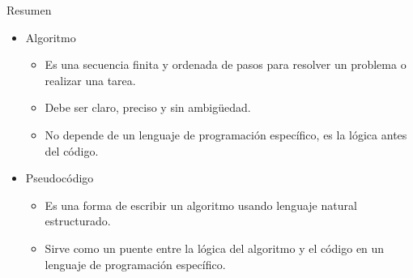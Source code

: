 \documentclass{beamer}
\begin{document}

    \begin{frame}{Resumen}
        \begin{itemize}
            \item Algoritmo
            \begin{itemize}
                \item Es una secuencia finita y ordenada de pasos para resolver un problema 
                o realizar una tarea.
                \item Debe ser claro, preciso y sin ambigüedad.
                \item No depende de un lenguaje de programación específico, es la lógica antes del código.
            \end{itemize}
            \item Pseudocódigo
            \begin{itemize}
                \item Es una forma de escribir un algoritmo usando lenguaje natural estructurado.
                \item Sirve como un puente entre la lógica del algoritmo y el código en un lenguaje de programación específico.
            \end{itemize}
        \end{itemize}
    \end{frame}

\end{document}
